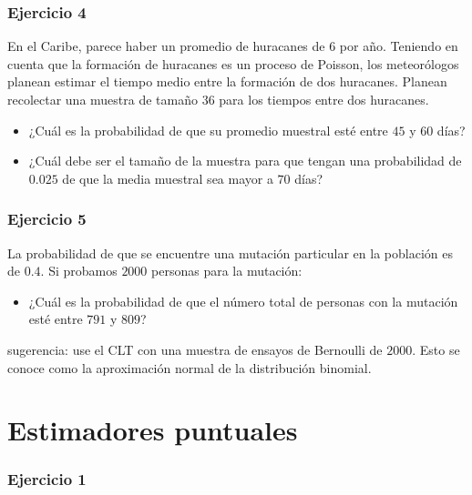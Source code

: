 \documentclass[
]{book}
\providecommand{\tightlist}{%
  \setlength{\itemsep}{0pt}\setlength{\parskip}{0pt}}
\begin{document}
\hypertarget{ejercicio-4-3}{%
\subsubsection{Ejercicio 4}\label{ejercicio-4-3}}

En el Caribe, parece haber un promedio de huracanes de \(6\) por año. Teniendo en cuenta que la formación de huracanes es un proceso de Poisson, los meteorólogos planean estimar el tiempo medio entre la formación de dos huracanes. Planean recolectar una muestra de tamaño \(36\) para los tiempos entre dos huracanes.

\begin{itemize}
\item
  ¿Cuál es la probabilidad de que su promedio muestral esté entre \(45\) y \(60\) días?
\item
  ¿Cuál debe ser el tamaño de la muestra para que tengan una probabilidad de \(0.025\) de que la media muestral sea mayor a \(70\) días?
\end{itemize}

\hypertarget{ejercicio-5-2}{%
\subsubsection{Ejercicio 5}\label{ejercicio-5-2}}

La probabilidad de que se encuentre una mutación particular en la población es de \(0.4\). Si probamos \(2000\) personas para la mutación:

\begin{itemize}
\tightlist
\item
  ¿Cuál es la probabilidad de que el número total de personas con la mutación esté entre \(791\) y \(809\)?
\end{itemize}

sugerencia: use el CLT con una muestra de ensayos de Bernoulli de \(2000\). Esto se conoce como la aproximación normal de la distribución binomial.

\hypertarget{estimadores-puntuales}{%
\section{Estimadores puntuales}\label{estimadores-puntuales}}

\hypertarget{ejercicio-1-6}{%
\subsubsection{Ejercicio 1}\label{ejercicio-1-6}}
\end{document}
